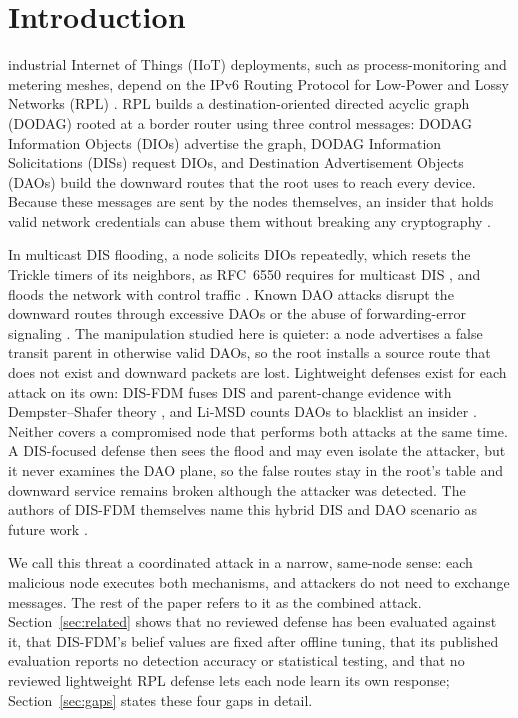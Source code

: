 \section{Introduction}\label{sec:introduction}
 industrial Internet of Things (IIoT) deployments, such as process-monitoring and metering meshes, depend on the IPv6 Routing Protocol for Low-Power and Lossy Networks (RPL) \cite{rfc6550}. RPL builds a destination-oriented directed acyclic graph (DODAG) rooted at a border router using three control messages: DODAG Information Objects (DIOs) advertise the graph, DODAG Information Solicitations (DISs) request DIOs, and Destination Advertisement Objects (DAOs) build the downward routes that the root uses to reach every device. Because these messages are sent by the nodes themselves, an insider that holds valid network credentials can abuse them without breaking any cryptography \cite{albinali2024,raoof2019}.

In multicast DIS flooding, a node solicits DIOs repeatedly, which resets the Trickle timers \cite{rfc6206} of its neighbors, as RFC~6550 requires for multicast DIS \cite{rfc6550}, and floods the network with control traffic \cite{rajasekar2022,vermaranga2020,medjek2021}. Known DAO attacks disrupt the downward routes through excessive DAOs or the abuse of forwarding-error signaling \cite{pu2018,ghaleb2019,limsd2024}. The manipulation studied here is quieter: a node advertises a false transit parent in otherwise valid DAOs, so the root installs a source route \cite{rfc6554} that does not exist and downward packets are lost. Lightweight defenses exist for each attack on its own: DIS-FDM fuses DIS and parent-change evidence with Dempster--Shafer theory \cite{prajisha2025}, and Li-MSD counts DAOs to blacklist an insider \cite{limsd2024}. Neither covers a compromised node that performs both attacks at the same time. A DIS-focused defense then sees the flood and may even isolate the attacker, but it never examines the DAO plane, so the false routes stay in the root's table and downward service remains broken although the attacker was detected. The authors of DIS-FDM themselves name this hybrid DIS and DAO scenario as future work \cite{prajisha2025}.

We call this threat a coordinated attack in a narrow, same-node sense: each malicious node executes both mechanisms, and attackers do not need to exchange messages. The rest of the paper refers to it as the combined attack. Section~\ref{sec:related} shows that no reviewed defense has been evaluated against it, that DIS-FDM's belief values are fixed after offline tuning, that its published evaluation reports no detection accuracy or statistical testing, and that no reviewed lightweight RPL defense lets each node learn its own response; Section~\ref{sec:gaps} states these four gaps in detail.

